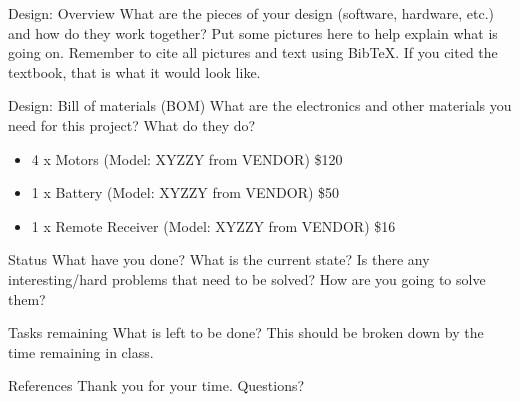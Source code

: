 \documentclass{beamer}
\begin{document}
\begin{frame}{Design: Overview}
What are the pieces of your design (software, hardware, etc.)  and how
do they work together?  Put some pictures here to help explain what is
going on.  Remember to cite all pictures and text using BibTeX.  If you cited
the textbook\cite{carryer2011IntroMechatronics}, that is what it would
look like.
\end{frame}

\begin{frame}{Design: Bill of materials (BOM)}
What are the electronics and other materials you need for this
project?  What do they do? 

\begin{itemize}
\item 4 x Motors (Model: XYZZY from VENDOR) \$120
\item 1 x Battery  (Model: XYZZY from VENDOR) \$50
\item 1 x Remote Receiver   (Model: XYZZY from VENDOR) \$16
\end{itemize}
\end{frame}

\begin{frame}{Status}
What have you done?  What is the current state?  Is there any interesting/hard problems
that need to be solved?  How are you going to solve them?
\end{frame}

\begin{frame}{Tasks remaining}
What is left to be done?  This should be broken down by the time remaining in class.
\end{frame}

\begin{frame}{References}
Thank you for your time.
Questions?


\end{frame}
\end{document}
